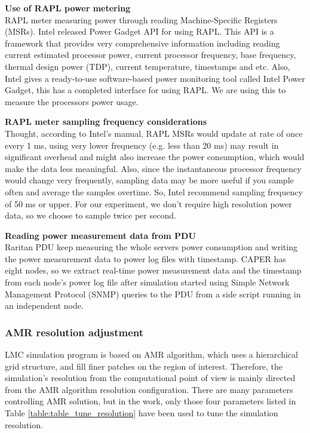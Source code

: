 \documentclass[10pt, conference, compsocconf]{IEEEtran}
\begin{document}
\textbf{Use of RAPL power metering}\\
RAPL meter measuring power through reading Machine-Specific Registers (MSRs). Intel released Power Gadget API for using RAPL. This API is a framework that provides very comprehensive information including reading current estimated processor power, current processor frequency, base frequency, thermal design power (TDP), current temperature, timestamps and etc. Also, Intel gives a ready-to-use software-based power monitoring tool called Intel Power Gadget, this has a completed interface for using RAPL. We are using this to measure the processors power usage. 


\textbf{RAPL meter sampling frequency considerations}\\
Thought, according to Intel’s manual,\cite{intel64and} RAPL MSRs would update at rate of once every 1 ms, using very lower frequency (e.g. less than 20 ms) may result in significant overhead and might also increase the power consumption, which would make the data less meaningful.\cite{usingtheintelpowergadgetapionmacosx} Also, since the instantaneous processor frequency would change very frequently, sampling data may be more useful if you sample often and average the samples overtime. So, Intel recommend sampling frequency of 50 ms or upper. For our experiment, we don’t require high resolution power data, so we choose to sample twice per second.


\textbf{Reading power measurement data from PDU}\\
Raritan PDU keep measuring the whole servers power consumption and writing the power measurement data to power log files with timestamp. CAPER has eight nodes, so we extract real-time power measurement data and the timestamp from each node’s power log file after simulation started using Simple Network Management Protocol (SNMP) queries to the PDU from a side script running in an independent node.


\subsubsection{AMR resolution adjustment}
LMC simulation program is based on AMR algorithm, which uses a hierarchical grid structure, and fill finer patches on the region of interest. Therefore, the simulation’s resolution from the computational point of view is mainly directed from the AMR algorithm resolution configuration. There are many parameters controlling AMR solution, but in the work, only those four parameters listed in Table \ref{table:table_tune_resolution} have been used to tune the simulation resolution. 
\end{document}

